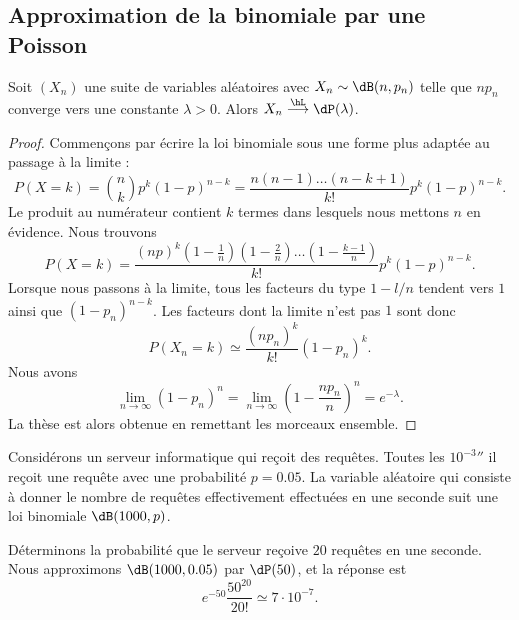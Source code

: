 \subsection{Approximation de la binomiale par une Poisson}

\begin{proposition}
	Soit \( (X_n)\) une suite de variables aléatoires avec \( X_n\sim\dB(n,p_n)\) telle que \( np_n\) converge vers une constante \( \lambda>0\). Alors \( X_n\stackrel{\hL}{\longrightarrow}\dP(\lambda)\).
\end{proposition}

\begin{proof}
	Commençons par écrire la loi binomiale sous une forme plus adaptée au passage à la limite :
	\begin{equation}
		P(X=k)={n\choose k}p^k(1-p)^{n-k}=\frac{ n(n-1)\ldots (n-k+1) }{ k! }p^k(1-p)^{n-k}.
	\end{equation}
	Le produit au numérateur contient \( k\) termes dans lesquels nous mettons \( n\) en évidence. Nous trouvons
	\begin{equation}
		P(X=k)=\frac{ (np)^k\left( 1-\frac{1}{ n } \right)\left( 1-\frac{ 2 }{ n } \right)\ldots\left( 1-\frac{ k-1 }{ n } \right) }{ k! }p^k(1-p)^{n-k}.
	\end{equation}
	Lorsque nous passons à la limite, tous les facteurs du type \( 1-l/n\) tendent vers \( 1\) ainsi que \( (1-p_n)^{n-k}\). Les facteurs dont la limite n'est pas \( 1\) sont donc
	\begin{equation}
		P(X_n=k)\simeq\frac{ (np_n)^k }{ k! }(1-p_n)^k.
	\end{equation}
	Nous avons
	\begin{equation}
		\lim_{n\to \infty} (1-p_n)^n=\lim_{n\to \infty} \left( 1-\frac{ np_n }{ n } \right)^n= e^{-\lambda}.
	\end{equation}
	La thèse est alors obtenue en remettant les morceaux ensemble.
\end{proof}

\begin{example}
	Considérons un serveur informatique qui reçoit des requêtes. Toutes les \( \unit{10^{-3}}{\second}\) il reçoit une requête avec une probabilité \( p=0.05\). La variable aléatoire qui consiste à donner le nombre de requêtes effectivement effectuées en une seconde suit une loi binomiale \( \dB(1000,p)\).

	Déterminons la probabilité que le serveur reçoive \( 20\) requêtes en une seconde. Nous approximons \( \dB(1000,0.05)\) par \( \dP(50)\), et la réponse est
	\begin{equation}
		e^{-50}\frac{ 50^{20} }{ 20! }\simeq 7\cdot 10^{-7}.
	\end{equation}
\end{example}


